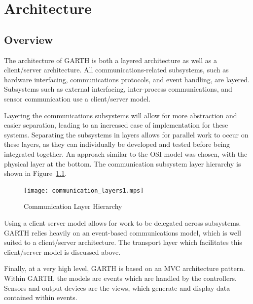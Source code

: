 \documentclass{report}
\begin{document}

\chapter{Architecture} %
\label{ch:architecture}

\section{Overview}

The architecture of GARTH is both a layered architecture as well as a
client/server architecture. All communications-related subsystems, such as
hardware interfacing, communications protocols, and event handling, are
layered. Subsystems such as external interfacing, inter-process communications,
and sensor communication use a client/server model.

Layering the communications subsystems will allow for more abstraction and
easier separation, leading to an increased ease of implementation for these
systems. Separating the subsystems in layers allows for parallel work to occur
on these layers, as they can individually be developed and tested before being
integrated together. An approach similar to the OSI model was chosen, with the
physical layer at the bottom. The communication subsystem layer hierarchy is
shown in Figure~\ref{fig:communication_layers}.

\begin{figure}[hp]
    \centering
        \caption{Communication Layer Hierarchy}
        \scriptsize
        \setlength{\unitlength}{2.0em}
        \texttt{[image: communication\_layers1.mps]}
        \normalsize
    \label{fig:communication_layers}
\end{figure}

Using a client server model allows for work to be delegated across
subsystems. GARTH relies heavily on an event-based communications model, which
is well suited to a client/server architecture. The transport layer which
facilitates this client/server model is discussed above.

Finally, at a very high level, GARTH is based on an MVC architecture pattern.
Within GARTH, the models are events which are handled by the controllers. Sensors
and output devices are the views, which generate and display data contained within
events.
\end{document}
